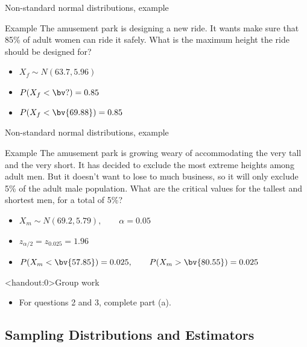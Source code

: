 \documentclass[xcolor=table, handout]{beamer}
\begin{document}
\begin{frame}{Non-standard normal distributions, example}
\begin{exampleblock}{Example}
The amusement park is designing a new ride. It wants make sure that 85\% of adult women can ride it safely. What is the maximum height the ride should be designed for?
\begin{itemize} 
\pause\item $X_f \sim N(63.7, 5.96)$
\pause\item $P(X_f <  \bv ?) = 0.85$
\pause\item $P(X_f <  \bv{69.88}) = 0.85$
\end{itemize}
\end{exampleblock}
\end{frame}

\begin{frame}{Non-standard normal distributions, example}
\begin{exampleblock}{Example}
The amusement park is growing weary of accommodating the very tall and the very short. It has decided to exclude the most extreme heights among adult men. But it doesn't want to lose to much business, so it will only exclude 5\% of the adult male population. What are the critical values for the tallest and shortest men, for a total of 5\%?
\begin{itemize} 
\pause\item $X_m \sim N(69.2, 5.79), \qquad \alpha = 0.05$
\pause\item $z_{\alpha/2} = z_{0.025} = 1.96$
\pause\item $P(X_m <  \bv{57.85}) = 0.025, \qquad P(X_m >  \bv{80.55}) = 0.025$
\end{itemize}

\end{exampleblock}
\end{frame}

\begin{frame}<handout:0>{Group work}
\begin{block}{}
\large
\begin{itemize}
\item For questions 2 and 3, complete part (a).
\end{itemize}
\end{block}
\end{frame}

\subsection{Sampling Distributions and Estimators}
\end{document}
